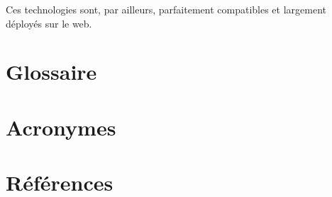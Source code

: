 \documentclass[a4paper,12pt]{article}
\begin{document}
Ces technologies sont, par ailleurs, parfaitement compatibles et largement déployés sur le web.
\section*{Glossaire}
\label{sec:org3906640}
\section*{Acronymes}
\label{sec:org55a530c}
\section*{Références}
\label{sec:org2473a76}
\printbibliography[heading=none]
\end{document}
